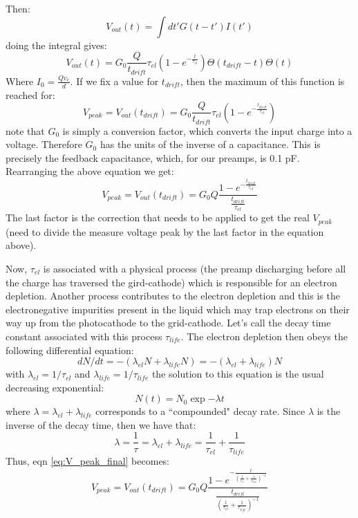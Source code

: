 \documentclass[a4paper,11pt]{article}
\begin{document}
Then:
\begin{equation}
V_{out} (t) = \int dt' G(t-t') I(t')
\end{equation}
doing the integral gives:
\begin{equation}
V_{out} (t) = G_0 \frac{Q}{t_{drift}} \tau_{el} \left (1-e^{-\frac{t}{\tau_{el}}} \right ) \Theta(t_{drift}-t) \Theta(t)
\end{equation}
Where $I_0 = \frac{Q v_e}{d}$. If we fix a value for $t_{drift}$, then the maximum of this function is reached for:
\begin{equation}
V_{peak} = V_{out} (t_{drift}) = G_0 \frac{Q}{t_{drift}}\tau_{el} \left (1-e^{-\frac{t_{drift}}{\tau_{el}}} \right)
\end{equation}
note that $G_0$ is simply a  conversion factor, which converts the input charge into a voltage. Therefore $G_0$ has the units of the inverse of a capacitance. This is precisely the feedback capacitance, which, for our preamps, is 0.1 pF. 
Rearranging the above equation we get:
\begin{equation}
V_{peak} = V_{out} (t_{drift}) = G_0 Q \frac{1-e^{-\frac{t_{drift}}{\tau_{el}}}}{\frac{t_{drift}}{\tau_{el}}}
\label{eq:V_peak_final}
\end{equation}
The last factor is the correction that needs to be applied to get the real $V_{peak}$ (need to divide the measure voltage peak by the last factor in the equation above).

Now, $\tau_{el}$ is associated with a physical process (the preamp discharging before all the charge has traversed the gird-cathode) which is responsible for an electron depletion. Another process contributes to the electron depletion and this is the electronegative impurities present in the liquid which may trap electrons on their way up from the photocathode to the grid-cathode. Let's call the decay time constant associated with this process $\tau_{life}$.
The electron depletion then obeys the following differential equation:
\begin{equation}
dN/dt = -(\lambda_{el} N + \lambda_{life} N) = - (\lambda_{el} + \lambda_{life}) N
\end{equation}
with $\lambda_{el}=1/\tau_{el}$ and $\lambda_{life}=1/\tau_{life}$
the solution to this equation is the usual decreasing exponential:
\begin{equation}
N(t) = N_0 \exp{-\lambda t}
\end{equation}
where $\lambda = \lambda_{el} + \lambda_{life}$ corresponds to a ``compounded" decay rate. Since $\lambda$ is the inverse of the decay time, then we have that:
\begin{equation}
\lambda = \frac{1}{\tau} = \lambda_{el} + \lambda_{life} = \frac{1}{\tau_{el}} + \frac{1}{\tau_{life}}
\end{equation}
Thus, eqn \ref{eq:V_peak_final} becomes:
\begin{equation}
V_{peak} = V_{out} (t_{drift}) = G_0 Q \frac{1-e^{-\frac{t}{(\frac{1}{\tau_{el}}+\frac{1}{\tau_{life}})^{-1}}}}{\frac{t_{drift}}{(\frac{1}{\tau_{el}}+\frac{1}{\tau_{life}})^{-1}}}
\end{equation}
\end{document}
